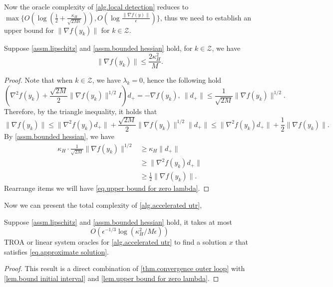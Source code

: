 \documentclass{article}
\begin{document}
Now the oracle complexity of \autoref{alg.local detection} reduces to $\max\{O \left (\log \left(\frac{1}{2}+\frac{\kappa_H}{\sqrt{2M\epsilon}}\right)\right),O\left(\log \frac{
\|\nabla f(y)\|
}{\epsilon}\right)\}$, thus we need to establish an upper bound for $\| \nabla f(y_k)\|$ for $k\in \mathcal{Z}$.
\begin{lemma}
    \label{lem.upper bound for zero lambda}
    Suppose \autoref{assm.lipschitz} and \autoref{assm.bounded hessian} hold, for $k\in \mathcal{Z}$, we have 
    \begin{equation}
        \label{eq.upper bound for zero lambda}
        \|\nabla f(y_k)\|\leq \frac{2\kappa_H^2}{M}.
    \end{equation}
\end{lemma}
\begin{proof}
    Note that when $k\in \mathcal{Z}$, we have $\lambda_k =0$, hence the following hold
    \begin{equation*}
        \left (\nabla^2 f(y_k)+\frac{\sqrt{2M}}{2}\|\nabla f(y_k)\|^{1/2} I\right )d_+ = -\nabla f(y_k), \ \|d_+\| \leq \frac{1}{\sqrt{2M}}\|\nabla f(y_k)\|^{1/2}.
    \end{equation*}
    Therefore, by the triangle inequality, it holds that
    \begin{equation*}
        \|\nabla f(y_k)\| \leq \|\nabla^2 f(y_k) d_+\| +\frac{\sqrt{2M}}{2}\|\nabla f(y_k)\|^{1/2}\|d_+\| \leq \|\nabla^2 f(y_k) d_+\|+\frac{1}{2}\|\nabla f(y_k)\|.
    \end{equation*}
    By \autoref{assm.bounded hessian}, we have 
    \begin{equation*}
        \begin{aligned}
            \kappa_H \cdot \frac{1}{\sqrt{2M}}\|\nabla f(y_k)\|^{1/2} &\geq \kappa_H \|d_+\| \\
            & \geq \|\nabla^2 f(y_k) d_+\|\\
            & \geq \frac{1}{2}\|\nabla f(y_k)\|.
        \end{aligned}
    \end{equation*}
    Rearrange items we will have \eqref{eq.upper bound for zero lambda}.
\end{proof}
Now we can present the total complexity of \autoref{alg.accelerated utr}, 
\begin{theorem}
    \label{thm.total complexity newton}
    Suppose \autoref{assm.lipschitz} and \autoref{assm.bounded hessian} hold, it takes at most 
    \begin{equation}\label{eq.total complexity newton}
        O\left (\epsilon^{-1/3}\log \left(\kappa_H^2/M\epsilon\right)\right)
    \end{equation}
    TROA or linear system oracles for \autoref{alg.accelerated utr} to find a solution $x$ that satisfies \eqref{eq.approximate solution}. 
\end{theorem}
\begin{proof}
    This result is a direct combination of \autoref{thm.convergence outer loop} with \autoref{lem.bound initial interval} and \autoref{lem.upper bound for zero lambda}.
\end{proof}
\end{document}
